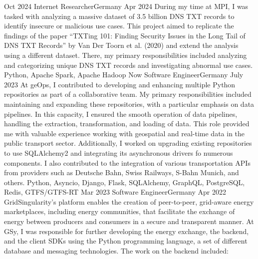 %
%
%

\begin{experiences}
  \experience
    {Oct 2024} {Internet Researcher}{}{Germany}
    {Apr 2024} {
      During my time at MPI, I was tasked with analyzing a massive dataset of 3.5 billion DNS TXT records to identify insecure or malicious use cases. This project aimed to replicate the findings of the paper “TXTing 101: Finding Security Issues in the Long Tail of DNS TXT Records” by Van Der Toorn et al. (2020) and extend the analysis using a different dataset. There, my primary responsibilities included analyzing and categorizing unique DNS TXT records and investigating abnormal use cases.
    }
    {Python, Apache Spark, Apache Hadoop}
  \emptySeparator
  \experience
    {Now} {Software Engineer}{}{Germany}
    {July 2023} {
      At geOps, I contributed to developing and enhancing multiple Python repositories as part of a collaborative team. My primary responsibilities included maintaining and expanding these repositories, with a particular emphasis on data pipelines. In this capacity, I ensured the smooth operation of data pipelines, handling the extraction, transformation, and loading of data. This role provided me with valuable experience working with geospatial and real-time data in the public transport sector. Additionally, I worked on upgrading existing repositories to use SQLAlchemy2 and integrating its asynchronous drivers fo numerous components. I also contributed to the integration of various transportation APIs from providers such as Deutsche Bahn, Swiss Railways, S-Bahn Munich, and others.    
    }
    {Python, Asyncio, Django, Flask, SQLAlchemy, GraphQL, PostgreSQL, Redis, GTFS/GTFS-RT}
  \emptySeparator
  \experience
  {Mar 2023} {Software Engineer}{}{Germany}
  {Apr 2022} {
    GridSingularity’s platform enables the creation of peer-to-peer, grid-aware energy marketplaces, including energy communities, that facilitate the exchange of energy between producers and consumers in a secure and transparent manner. At GSy, I was responsible for further developing the energy exchange, the backend, and the client SDKs using the Python programming language, a set of different database and messaging technologies. The work on the backend included:
}
\end{experiences}
